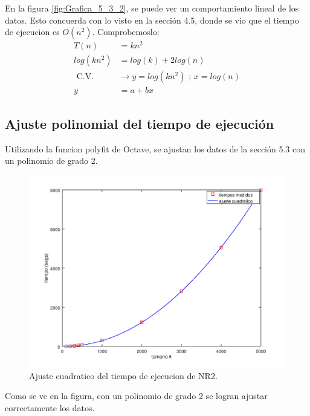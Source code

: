 \documentclass{endm}
\begin{document}
En la figura \ref{fig:Grafica_5_3_2}, se puede ver un comportamiento lineal de los datos.
Esto concuerda con lo visto en la sección 4.5, donde se vio que el tiempo de ejecucion es $O(n^2)$.
Comprobemoslo:
\begin{align}
    T(n) &= kn^2 \\
    log(kn^2) &= log(k) + 2log(n) \\
    \text{ C.V.}& \rightarrow y = log(kn^2) \text{ ; } x = log(n) \\
    y &= a + bx
\end{align}

\subsection{Ajuste polinomial del tiempo de ejecución}
Utilizando la funcion polyfit de Octave, se ajustan los datos de la sección 5.3 con un polinomio de grado 2.
\begin{figure}[h!]
    \includegraphics[width=\linewidth]{Grafica_5_4.png}
    \caption{Ajuste cuadratico del tiempo de ejecucion de NR2.}
    \label{fig:Grafica_5_4}
\end{figure}
Como se ve en la figura, con un polinomio de grado 2 se logran ajustar correctamente los datos.
\clearpage
\printbibliography
\end{document}
